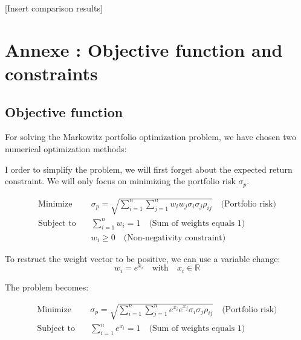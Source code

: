 \documentclass[12pt]{article}
\begin{document}
[Insert comparison results]

\section*{Annexe : Objective function and constraints}

\subsection*{Objective function}

For solving the Markowitz portfolio optimization problem, we have chosen two numerical optimization methods:


I order to simplify the problem, we will first forget about the expected return constraint. We will only focus on minimizing the portfolio risk $\sigma_p$.

\begin{equation}
    \begin{aligned}
        \text{Minimize} \quad   & \sigma_p = \sqrt{\sum_{i=1}^{n}\sum_{j=1}^{n} w_i w_j \sigma_i \sigma_j \rho_{ij}} \quad \text{(Portfolio risk)} \\
        \text{Subject to} \quad & \sum_{i=1}^{n} w_i = 1 \quad \text{(Sum of weights equals 1)}                                                        \\
                                & w_i \geq 0 \quad \text{(Non-negativity constraint)}
    \end{aligned}
\end{equation}


To restruct the weight vector to be positive, we can use a variable change:
\begin{equation}
    w_i = e^{x_i} \quad \text{with} \quad x_i \in \mathbb{R}
\end{equation}

The problem becomes:

\begin{equation}
    \begin{aligned}
        \text{Minimize} \quad   & \sigma_p = \sqrt{\sum_{i=1}^{n}\sum_{j=1}^{n} e^{x_i} e^{x_j} \sigma_i \sigma_j \rho_{ij}} \quad \text{(Portfolio risk)} \\
        \text{Subject to} \quad & \sum_{i=1}^{n} e^{x_i} = 1 \quad \text{(Sum of weights equals 1)}    
    \end{aligned}
\end{equation}
\end{document}
